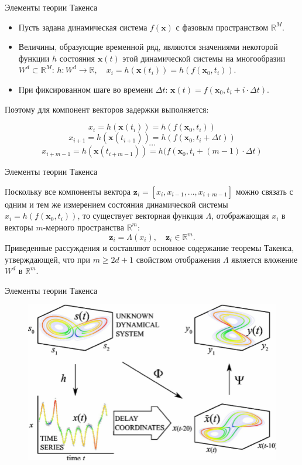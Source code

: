 \begin{frame}{Элементы теории Такенса}
\begin{itemize}
    \item Пусть задана динамическая система $f(\mathbf{x})$ с фазовым пространством $\mathbb{R}^M$.
    \item Величины, образующие временной ряд, являются значениями некоторой функции $h$ состояния $\mathbf{x}(t)$ этой динамической системы на многообразии $W^d \subset \mathbb{R}^M$: $h:W^d \rightarrow \mathbb{R}, \quad x_i = h(\mathbf{x}(t_i)) = h(f(\mathbf{x}_0,t_i))$. 
    \item При фиксированном шаге во времени $\Delta t$: $\mathbf{x}(t) = f(\mathbf{x}_0,t_i + i \cdot \Delta t)$.
\end{itemize}
Поэтому для компонент векторов задержки выполняется:

$$ x_i = h(\mathbf{x}(t_i)) = h(f(\mathbf{x}_0,t_i)) $$
$$ x_{i+1} = h(\mathbf{x}(t_{i+1})) = h(f(\mathbf{x}_0,t_i + \Delta t)) $$
$$ \dots $$
$$ x_{i+m-1} = h(\mathbf{x}(t_{i + m - 1})) = h(f(\mathbf{x}_0,t_i + (m-1)\cdot \Delta t) $$


\end{frame}
\begin{frame}{Элементы теории Такенса}

Поскольку все компоненты вектора $\mathbf{z}_i = [x_i, x_{i - 1}, ..., x_{i+m - 1}]$ можно связать с одним и тем же измерением состояния динамической системы $x_i =  h(f(\mathbf{x}_0,t_i))$, то существует векторная функция $\Lambda$, отображающая $x_i$ в векторы $m$-мерного пространства $\mathbb{R}^m$:
$$
\mathbf{z}_i = \Lambda(x_i),  \quad \mathbf{z}_i \in \mathbb{R}^m.
$$
Приведенные рассуждения и составляют основное содержание теоремы
Такенса, утверждающей, что при $m \geq 2d + 1$ свойством
отображения $\Lambda$ является вложение $W^d$ в $\mathbb{R}^m$.

\end{frame}
\begin{frame}{Элементы теории Такенса}
\begin{figure}
    \centering
    \includegraphics[width=\textwidth]{lecture_4/figs/CCM-1.png}
\end{figure}
\end{frame}

